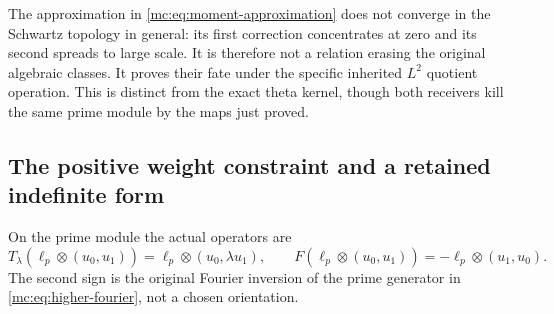 The approximation in \eqref{mc:eq:moment-approximation} does not
converge in the Schwartz topology in general: its first correction
concentrates at zero and its second spreads to large scale. It is
therefore not a relation erasing the original algebraic classes.
It proves their fate under the specific inherited $L^2$ quotient
operation. This is distinct from the exact theta kernel, though
both receivers kill the same prime module by the maps just proved.

\subsection{The positive weight constraint and a retained indefinite form}

On the prime module the actual operators are
\[
 T_\lambda(\ell_p\otimes(u_0,u_1))
       =\ell_p\otimes(u_0,\lambda u_1),\qquad
 F(\ell_p\otimes(u_0,u_1))
       =-\ell_p\otimes(u_1,u_0).
 \tag{MC26}\label{mc:eq:prime-operators}
\]
The second sign is the original Fourier inversion of the prime
generator in \eqref{mc:eq:higher-fourier}, not a chosen orientation.

